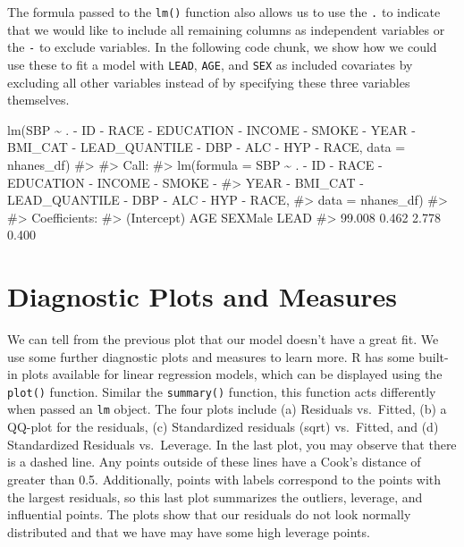 \documentclass[
  letterpaper,
]{latex/krantz}
\makeatletter
\newenvironment{Shaded}{\begin{snugshade}}{\end{snugshade}}
\newcommand{\AttributeTok}[1]{\textcolor[rgb]{0.40,0.45,0.13}{#1}}
\newcommand{\CommentTok}[1]{\textcolor[rgb]{0.37,0.37,0.37}{#1}}
\newcommand{\FunctionTok}[1]{\textcolor[rgb]{0.28,0.35,0.67}{#1}}
\newcommand{\NormalTok}[1]{\textcolor[rgb]{0.00,0.23,0.31}{#1}}
\newcommand{\SpecialCharTok}[1]{\textcolor[rgb]{0.37,0.37,0.37}{#1}}
\newenvironment{kframe}{%
\medskip{}
\setlength{\fboxsep}{.8em}
 \def\at@end@of@kframe{}%
 \ifinner\ifhmode%
  \def\at@end@of@kframe{\end{minipage}}%
  \begin{minipage}{\columnwidth}%
 \fi\fi%
 \def\FrameCommand##1{\hskip\@totalleftmargin \hskip-\fboxsep
 \colorbox{shadecolor}{##1}\hskip-\fboxsep
     \hskip-\linewidth \hskip-\@totalleftmargin \hskip\columnwidth}%
 \MakeFramed {\advance\hsize-\width
   \@totalleftmargin\z@ \linewidth\hsize
   \@setminipage}}%
 {\par\unskip\endMakeFramed%
 \at@end@of@kframe}
\renewenvironment{Shaded}{\begin{kframe}}{\end{kframe}}
\makeatother
\begin{document}
The formula passed to the \texttt{lm()} function also allows us to use
the \texttt{.} to indicate that we would like to include all remaining
columns as independent variables or the \texttt{-} to exclude variables.
In the following code chunk, we show how we could use these to fit a
model with \texttt{LEAD}, \texttt{AGE}, and \texttt{SEX} as included
covariates by excluding all other variables instead of by specifying
these three variables themselves.

\begin{Shaded}
\begin{Highlighting}[]
\FunctionTok{lm}\NormalTok{(SBP }\SpecialCharTok{\textasciitilde{}}\NormalTok{ . }\SpecialCharTok{{-}}\NormalTok{ ID }\SpecialCharTok{{-}}\NormalTok{ RACE }\SpecialCharTok{{-}}\NormalTok{ EDUCATION }\SpecialCharTok{{-}}\NormalTok{ INCOME }\SpecialCharTok{{-}}\NormalTok{ SMOKE }\SpecialCharTok{{-}}\NormalTok{ YEAR }\SpecialCharTok{{-}}\NormalTok{ BMI\_CAT }\SpecialCharTok{{-}} 
\NormalTok{   LEAD\_QUANTILE }\SpecialCharTok{{-}}\NormalTok{ DBP }\SpecialCharTok{{-}}\NormalTok{ ALC }\SpecialCharTok{{-}}\NormalTok{ HYP }\SpecialCharTok{{-}}\NormalTok{ RACE, }\AttributeTok{data =}\NormalTok{ nhanes\_df)}
\CommentTok{\#\textgreater{} }
\CommentTok{\#\textgreater{} Call:}
\CommentTok{\#\textgreater{} lm(formula = SBP \textasciitilde{} . {-} ID {-} RACE {-} EDUCATION {-} INCOME {-} SMOKE {-} }
\CommentTok{\#\textgreater{}     YEAR {-} BMI\_CAT {-} LEAD\_QUANTILE {-} DBP {-} ALC {-} HYP {-} RACE, }
\CommentTok{\#\textgreater{}     data = nhanes\_df)}
\CommentTok{\#\textgreater{} }
\CommentTok{\#\textgreater{} Coefficients:}
\CommentTok{\#\textgreater{} (Intercept)          AGE      SEXMale         LEAD  }
\CommentTok{\#\textgreater{}      99.008        0.462        2.778        0.400}
\end{Highlighting}
\end{Shaded}

\section{\texorpdfstring{Diagnostic Plots and Measures
}{Diagnostic Plots and Measures }}\label{diagnostic-plots-and-measures}

We can tell from the previous plot that our model doesn't have a great
fit. We use some further diagnostic plots and measures to learn more. R
has some built-in plots available for linear regression models, which
can be displayed using the
\texttt{plot()} function.
Similar the \texttt{summary()} function, this function acts differently
when passed an \texttt{lm} object. The four plots include (a) Residuals
vs.~Fitted, (b) a QQ-plot for the residuals, (c) Standardized residuals
(sqrt) vs.~Fitted, and (d) Standardized Residuals vs.~Leverage. In the
last plot, you may observe that there is a dashed line. Any points
outside of these lines have a Cook's distance of greater than 0.5.
Additionally, points with labels correspond to the points with the
largest residuals, so this last plot summarizes the outliers, leverage,
and influential points. The plots show that our residuals do not look
normally distributed and that we have may have some high leverage
points.
\end{document}
